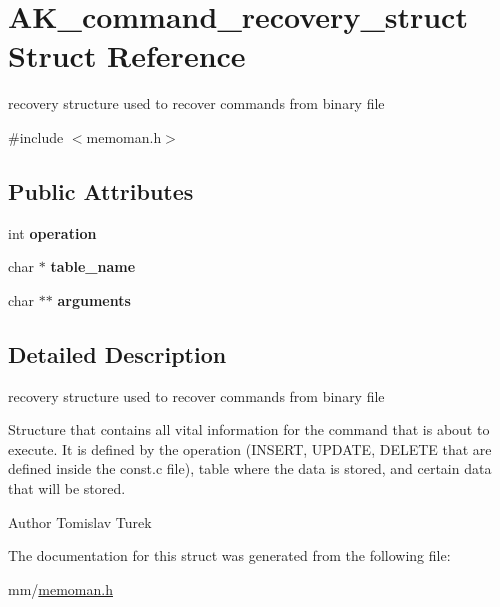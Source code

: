 \hypertarget{structAK__command__recovery__struct}{}\section{A\+K\+\_\+command\+\_\+recovery\+\_\+struct Struct Reference}
\label{structAK__command__recovery__struct}


recovery structure used to recover commands from binary file  




{\ttfamily \#include $<$memoman.\+h$>$}

\subsection*{Public Attributes}
\begin{DoxyCompactItemize}
\item 
int {\bfseries operation}\hypertarget{structAK__command__recovery__struct_a18dc268f00bb5f619e36f2f9fda39dc9}{}\label{structAK__command__recovery__struct_a18dc268f00bb5f619e36f2f9fda39dc9}

\item 
char $\ast$ {\bfseries table\+\_\+name}\hypertarget{structAK__command__recovery__struct_a0c5acb9c190dc8e6ff8cf116d4d20851}{}\label{structAK__command__recovery__struct_a0c5acb9c190dc8e6ff8cf116d4d20851}

\item 
char $\ast$$\ast$ {\bfseries arguments}\hypertarget{structAK__command__recovery__struct_ace43b855af22c421103d9cd595347db4}{}\label{structAK__command__recovery__struct_ace43b855af22c421103d9cd595347db4}

\end{DoxyCompactItemize}


\subsection{Detailed Description}
recovery structure used to recover commands from binary file 

Structure that contains all vital information for the command that is about to execute. It is defined by the operation (I\+N\+S\+E\+RT, U\+P\+D\+A\+TE, D\+E\+L\+E\+TE that are defined inside the const.\+c file), table where the data is stored, and certain data that will be stored. \begin{DoxyAuthor}{Author}
Tomislav Turek 
\end{DoxyAuthor}


The documentation for this struct was generated from the following file\+:\begin{DoxyCompactItemize}
\item 
mm/\hyperlink{memoman_8h}{memoman.\+h}\end{DoxyCompactItemize}
